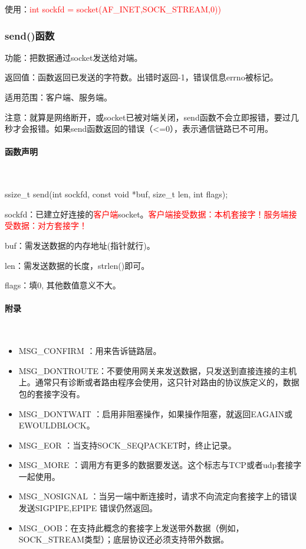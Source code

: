 \documentclass[UTF8]{article}%
\begin{document}
使用：\textcolor{red}{int sockfd = socket(AF\_INET,SOCK\_STREAM,0))}

\subsubsection{send()函数}

功能：把数据通过socket发送给对端。

返回值：函数返回已发送的字符数。出错时返回-1，错误信息errno被标记。

适用范围：客户端、服务端。

注意：就算是网络断开，或socket已被对端关闭，send函数不会立即报错，要过几秒才会报错。如果send函数返回的错误（<=0），表示通信链路已不可用。

\paragraph{函数声明}~{}

ssize\_t send(int sockfd, const void *buf, size\_t len, int flags);

sockfd：已建立好连接的\textcolor{red}{客户端}socket。\textcolor{red}{客户端接受数据：本机套接字！服务端接受数据：对方套接字！}

buf：需发送数据的内存地址(指针就行)。

len：需发送数据的长度，strlen()即可。

flags：填0, 其他数值意义不大。

\paragraph{附录}~{}

\begin{itemize}
    \item MSG\_CONFIRM ：用来告诉链路层。
    \item MSG\_DONTROUTE：不要使用网关来发送数据，只发送到直接连接的主机上。通常只有诊断或者路由程序会使用，这只针对路由的协议族定义的，数据包的套接字没有。
    \item MSG\_DONTWAIT ：启用非阻塞操作，如果操作阻塞，就返回EAGAIN或EWOULDBLOCK。
    \item MSG\_EOR ：当支持SOCK\_SEQPACKET时，终止记录。
    \item MSG\_MORE ：调用方有更多的数据要发送。这个标志与TCP或者udp套接字一起使用。
    \item MSG\_NOSIGNAL ：当另一端中断连接时，请求不向流定向套接字上的错误发送SIGPIPE,EPIPE 错误仍然返回。
    \item MSG\_OOB：在支持此概念的套接字上发送带外数据（例如，SOCK\_STREAM类型）；底层协议还必须支持带外数据。
\end{itemize}
\end{document}
